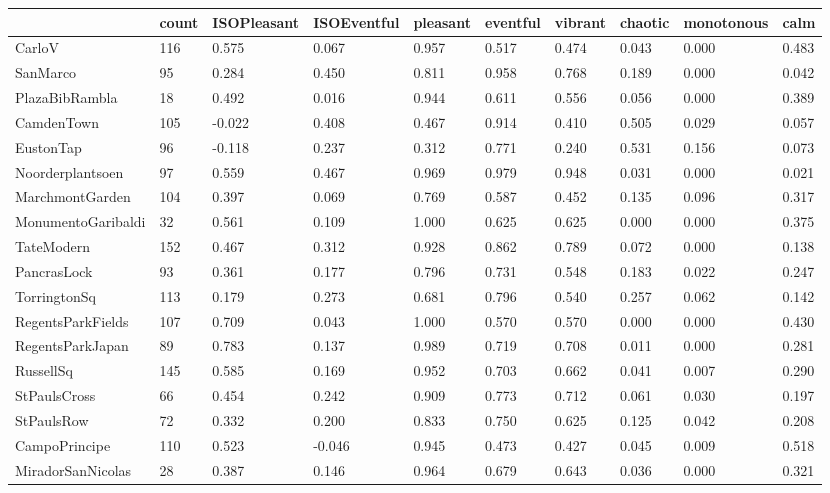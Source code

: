 \documentclass[
  authoryear,
  preprint,
  3p]{elsarticle}
\begin{document}
\begin{longtable}[]{@{}llllllllll@{}}
\toprule\noalign{}
& count & ISOPleasant & ISOEventful & pleasant & eventful & vibrant &
chaotic & monotonous & calm \\
\midrule\noalign{}
\endhead
\bottomrule\noalign{}
\endlastfoot
CarloV & 116 & 0.575 & 0.067 & 0.957 & 0.517 & 0.474 & 0.043 & 0.000 &
0.483 \\
SanMarco & 95 & 0.284 & 0.450 & 0.811 & 0.958 & 0.768 & 0.189 & 0.000 &
0.042 \\
PlazaBibRambla & 18 & 0.492 & 0.016 & 0.944 & 0.611 & 0.556 & 0.056 &
0.000 & 0.389 \\
CamdenTown & 105 & -0.022 & 0.408 & 0.467 & 0.914 & 0.410 & 0.505 &
0.029 & 0.057 \\
EustonTap & 96 & -0.118 & 0.237 & 0.312 & 0.771 & 0.240 & 0.531 & 0.156
& 0.073 \\
Noorderplantsoen & 97 & 0.559 & 0.467 & 0.969 & 0.979 & 0.948 & 0.031 &
0.000 & 0.021 \\
MarchmontGarden & 104 & 0.397 & 0.069 & 0.769 & 0.587 & 0.452 & 0.135 &
0.096 & 0.317 \\
MonumentoGaribaldi & 32 & 0.561 & 0.109 & 1.000 & 0.625 & 0.625 & 0.000
& 0.000 & 0.375 \\
TateModern & 152 & 0.467 & 0.312 & 0.928 & 0.862 & 0.789 & 0.072 & 0.000
& 0.138 \\
PancrasLock & 93 & 0.361 & 0.177 & 0.796 & 0.731 & 0.548 & 0.183 & 0.022
& 0.247 \\
TorringtonSq & 113 & 0.179 & 0.273 & 0.681 & 0.796 & 0.540 & 0.257 &
0.062 & 0.142 \\
RegentsParkFields & 107 & 0.709 & 0.043 & 1.000 & 0.570 & 0.570 & 0.000
& 0.000 & 0.430 \\
RegentsParkJapan & 89 & 0.783 & 0.137 & 0.989 & 0.719 & 0.708 & 0.011 &
0.000 & 0.281 \\
RussellSq & 145 & 0.585 & 0.169 & 0.952 & 0.703 & 0.662 & 0.041 & 0.007
& 0.290 \\
StPaulsCross & 66 & 0.454 & 0.242 & 0.909 & 0.773 & 0.712 & 0.061 &
0.030 & 0.197 \\
StPaulsRow & 72 & 0.332 & 0.200 & 0.833 & 0.750 & 0.625 & 0.125 & 0.042
& 0.208 \\
CampoPrincipe & 110 & 0.523 & -0.046 & 0.945 & 0.473 & 0.427 & 0.045 &
0.009 & 0.518 \\
MiradorSanNicolas & 28 & 0.387 & 0.146 & 0.964 & 0.679 & 0.643 & 0.036 &
0.000 & 0.321 \\
\end{longtable}
\end{document}
